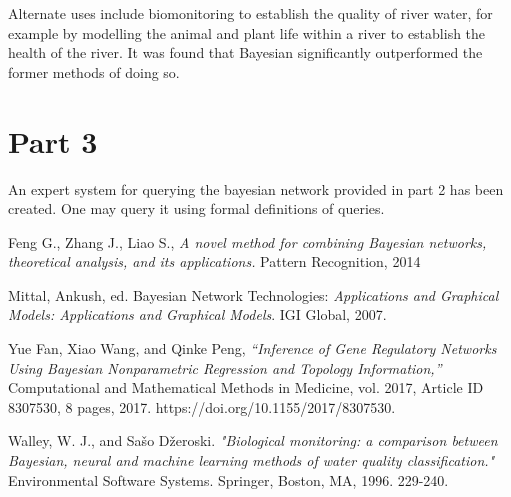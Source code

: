 \documentclass[10pt,a4paper]{article}
\begin{document}
Alternate uses include biomonitoring to establish the quality of river water, for example by modelling the animal and plant life within a river to establish the health of the river. It was found that Bayesian significantly outperformed the former methods of doing so\cite{biomonitoring}.

\section{Part 3}

An expert system for querying the bayesian network provided in part 2 has been created. One may query it using formal definitions of queries. 

\begin{thebibliography}{9}
Feng G., Zhang J., Liao S., 
\textit{A novel method for combining Bayesian networks, theoretical
analysis, and its applications.} Pattern Recognition, 2014
 
Mittal, Ankush, ed. Bayesian Network Technologies: \textit{Applications and Graphical Models: Applications and Graphical Models}. IGI Global, 2007.

Yue Fan, Xiao Wang, and Qinke Peng, \textit{“Inference of Gene Regulatory Networks Using Bayesian Nonparametric Regression and Topology Information,”} Computational and Mathematical Methods in Medicine, vol. 2017, Article ID 8307530, 8 pages, 2017. https://doi.org/10.1155/2017/8307530.

Walley, W. J., and Sašo Džeroski. \textit{"Biological monitoring: a comparison between Bayesian, neural and machine learning methods of water quality classification."} Environmental Software Systems. Springer, Boston, MA, 1996. 229-240.
\end{thebibliography}
\end{document}
